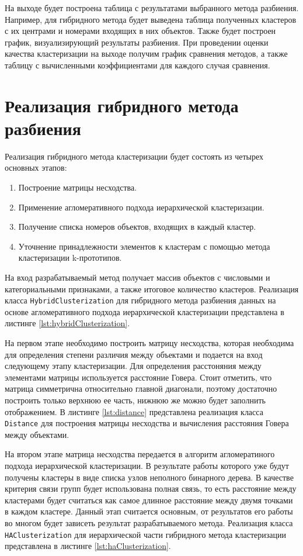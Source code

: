 На выходе будет построена таблица с результатами выбранного метода разбиения. Например, для гибридного метода будет выведена таблица полученных кластеров с их центрами и номерами входящих в них объектов. Также будет построен график, визуализирующий результаты разбиения.
При проведении оценки качества кластеризации на выходе получим график сравнения методов, а также таблицу с вычисленными коэффициентами для каждого случая сравнения.

\section{Реализация гибридного метода разбиения}

Реализация гибридного метода кластеризации будет состоять из четырех основных этапов:
\begin{enumerate}
    \item Построение матрицы несходства.
    \item Применение агломеративного подхода иерархической кластеризации.
    \item Получение списка номеров объектов, входящих в каждый кластер.
    \item Уточнение принадлежности элементов к кластерам с помощью метода кластеризации k-прототипов.
\end{enumerate}

На вход разрабатываемый метод получает массив объектов с числовыми и категориальными признаками, а также итоговое количество кластеров.
Реализация класса \texttt{HybridClusterization} для гибридного метода разбиения данных на основе агломеративного подхода иерархической кластеризации представлена в листинге \ref{lst:hybridClusterization}.

На первом этапе необходимо построить матрицу несходства, которая необходима для определения степени различия между объектами и подается на вход следующему этапу кластеризации. Для определения расстоняния между элементами матрицы используется расстояние Говера. Стоит отметить, что матрица симметрична относительно главной диагонали, поэтому достаточно построить только верхнюю ее часть, нижнюю же можно будет заполнить отображением.
В листинге \ref{lst:distance} представлена реализация класса \texttt{Distance} для построения матрицы несходства и вычисления расстояния Говера между объектами.

На втором этапе матрица несходства передается в алгоритм агломератиного подхода иерархической кластеризации. В результате работы которого уже будут получены кластеры в виде списка узлов неполного бинарного дерева. В качестве критерия связи групп будет использована полная связь, то есть расстояние между кластерами будет считаться как самое длинное расстояние между двумя точками в каждом кластере. Данный этап считается основным, от результатов его работы во многом будет зависеть результат разрабатываемого метода.
Реализация класса \texttt{HAClusterization} для иерархической части гибридного метода кластеризации представлена в листинге \ref{lst:haClusterization}.

